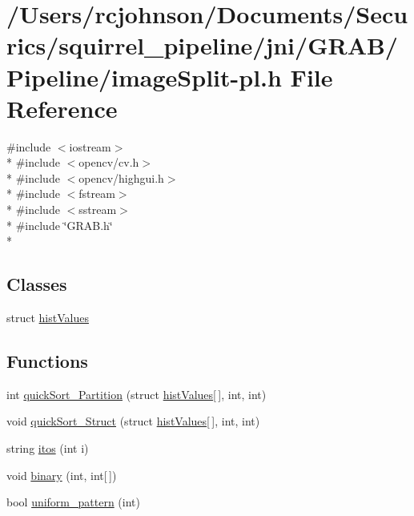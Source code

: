 \hypertarget{image_split-pl_8h}{\section{/\-Users/rcjohnson/\-Documents/\-Securics/squirrel\-\_\-pipeline/jni/\-G\-R\-A\-B/\-Pipeline/image\-Split-\/pl.h File Reference}
\label{image_split-pl_8h}
}
{\ttfamily \#include $<$iostream$>$}\\*
{\ttfamily \#include $<$opencv/cv.\-h$>$}\\*
{\ttfamily \#include $<$opencv/highgui.\-h$>$}\\*
{\ttfamily \#include $<$fstream$>$}\\*
{\ttfamily \#include $<$sstream$>$}\\*
{\ttfamily \#include \char`\"{}G\-R\-A\-B.\-h\char`\"{}}\\*
\subsection*{Classes}
\begin{DoxyCompactItemize}
\item 
struct \hyperlink{structhist_values}{hist\-Values}
\end{DoxyCompactItemize}
\subsection*{Functions}
\begin{DoxyCompactItemize}
\item 
int \hyperlink{image_split-pl_8h_acd58075f859b8f6752c07cd78aa58e13}{quick\-Sort\-\_\-\-Partition} (struct \hyperlink{structhist_values}{hist\-Values}\mbox{[}$\,$\mbox{]}, int, int)
\item 
void \hyperlink{image_split-pl_8h_a5fea9ab1ac0a507c6b70e4709ffdf023}{quick\-Sort\-\_\-\-Struct} (struct \hyperlink{structhist_values}{hist\-Values}\mbox{[}$\,$\mbox{]}, int, int)
\item 
string \hyperlink{image_split-pl_8h_a6f15c1976c17c86183b725028b469d3f}{itos} (int i)
\item 
void \hyperlink{image_split-pl_8h_a00cada095f0419ea7056b3f1c37f6a2d}{binary} (int, int\mbox{[}$\,$\mbox{]})
\item 
bool \hyperlink{image_split-pl_8h_a4c0e4f1b5db82cc8f99bd1a38d0dea9e}{uniform\-\_\-pattern} (int)
\end{DoxyCompactItemize}



